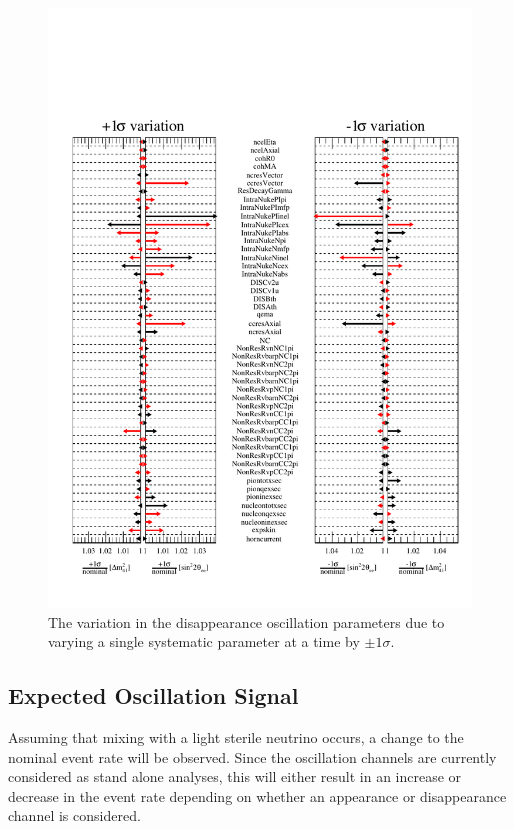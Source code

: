 \begin{figure}[h!]
    \centering
    \includegraphics[width = \largefigwidth]{figures-chap6/star_plot/nue_dsisapp_pulls.pdf}
    \caption[\nue disappearance oscillation parameter pulls due to varying a single systematic parameter by $\pm1\sigma$.]{The variation in the \nue disappearance oscillation parameters due to varying a single systematic parameter at a time by $\pm1\sigma$.}
    \label{fig:nue_disapp_osc_param_pulls}
\end{figure}


\clearpage


\subsection{Expected Oscillation Signal}

Assuming that mixing with a light sterile neutrino occurs, a change to the nominal event rate will be observed. Since the oscillation channels are currently considered as stand alone analyses, this will either result in an increase or decrease in the event rate depending on whether an appearance or disappearance channel is considered. 

